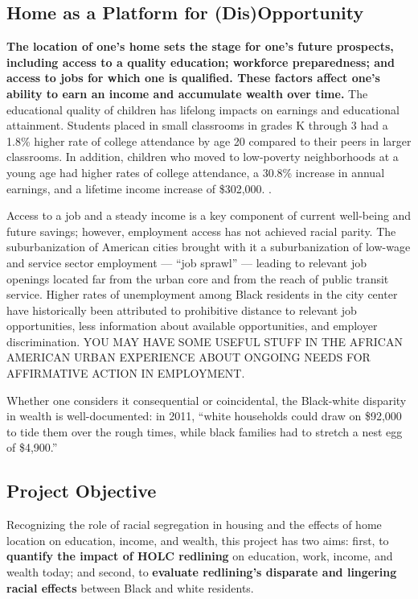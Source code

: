 \documentclass[paper=letter, fontsize=12pt]{scrartcl} %
\begin{document}
\subsection{Home as a Platform for (Dis)Opportunity}
\textbf{The location of one's home sets the stage for one's future prospects, including access to a quality education; workforce preparedness; and access to jobs for which one is qualified. These factors affect one's ability to earn an income and accumulate wealth over time.} The educational quality of children has lifelong impacts on earnings and educational attainment. Students placed in small classrooms in grades K through 3 had a 1.8\% higher rate of college attendance by age 20 compared to their peers in larger classrooms. \cite{chetty2} In addition, children who moved to low-poverty neighborhoods at a young age had higher rates of college attendance, a 30.8\% increase in annual earnings, and a lifetime income increase of \$302,000. \cite{chetty}.\par
Access to a job and a steady income is a key component of current well-being and future savings; however, employment access has not achieved racial parity. The suburbanization of American cities brought with it a suburbanization of low-wage and service sector employment --- ``job sprawl'' --- leading to relevant job openings located far from the urban core and from the reach of public transit service. \cite{briggs} Higher rates of unemployment among Black residents in the city center have historically been attributed to prohibitive distance to relevant job opportunities, less information about available opportunities, and employer discrimination. \cite{kain1} YOU MAY HAVE SOME USEFUL STUFF IN THE AFRICAN AMERICAN URBAN EXPERIENCE ABOUT ONGOING NEEDS FOR AFFIRMATIVE ACTION IN EMPLOYMENT. \par
Whether one considers it consequential or coincidental, the Black-white disparity in wealth is well-documented: in 2011, ``white households could draw on \$92,000 to tide them over the rough times, while black families had to stretch a nest egg of \$4,900.'' \cite{goldfield}\par

\subsection{Project Objective}
Recognizing the role of racial segregation in housing and the effects of home location on education, income, and wealth, this project has two aims: first, to \textbf{quantify the impact of HOLC redlining} on education, work, income, and wealth today; and second, to \textbf{evaluate redlining's disparate and lingering racial effects} between Black and white residents.\par
\end{document}
